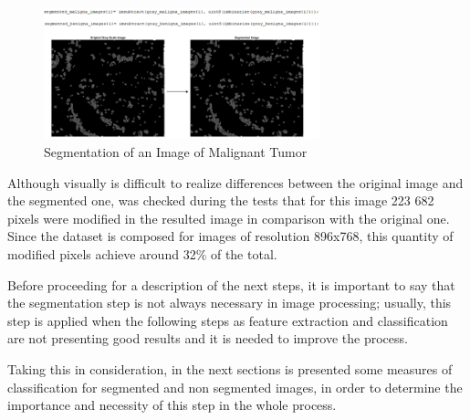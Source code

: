 \documentclass[conference]{IEEEtran}
\begin{document}
\begin{figure}[h]
    \centering
    \includegraphics[width=8cm]{images/imagem_segmentacao.png}
    \caption{Segmentation of an Image of Malignant Tumor}
    \label{fig:imagem_segmentacao}
\end{figure}

\par Although visually is difficult to realize differences between the original image and the segmented one, was checked during the tests that for this image 223 682 pixels were modified in the resulted image in comparison with the original one. Since the dataset is composed for images of resolution 896x768, this quantity of modified pixels achieve around 32\% of the total.

\par Before proceeding for a description of the next steps, it is important to say that the segmentation step is not always necessary in image processing; usually, this step is applied when the following steps as feature extraction and classification are not presenting good results and it is needed to improve the process.\par
Taking this in consideration, in the next sections is presented some measures of classification for segmented and non segmented images, in order to determine the importance and necessity of this step in the whole process.
\end{document}
